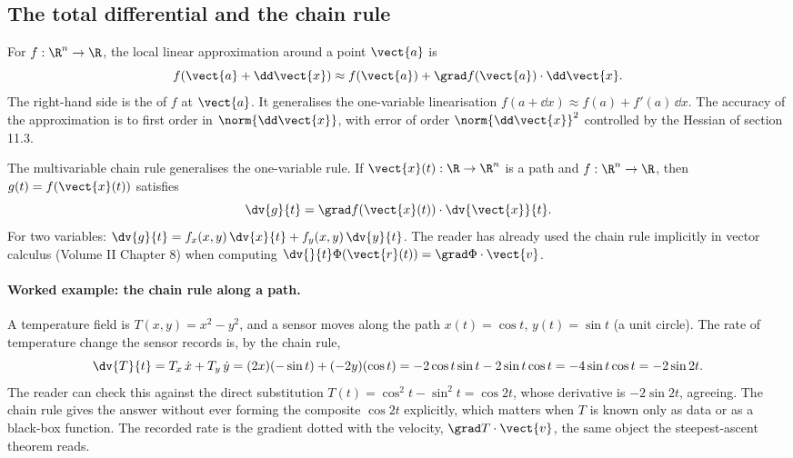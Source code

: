 

\subsection{The total differential and the chain rule}

For $f : \R^{n} \to \R$, the local linear approximation around a
point $\vect{a}$ is
\[
f(\vect{a} + \dd\vect{x}) \approx f(\vect{a}) + \grad f(\vect{a})
\cdot \dd\vect{x}.
\]
The right-hand side is the  of $f$ at
$\vect{a}$. It generalises the one-variable linearisation $f(a +
\dd x) \approx f(a) + f'(a)\,\dd x$. The accuracy of the
approximation is to first order in $\norm{\dd\vect{x}}$, with error
of order $\norm{\dd\vect{x}}^{2}$ controlled by the Hessian of
section 11.3.

The multivariable chain rule generalises the one-variable rule. If
$\vect{x}(t) : \R \to \R^{n}$ is a path and $f : \R^{n} \to \R$, then
$g(t) = f(\vect{x}(t))$ satisfies
\[
\dv{g}{t} = \grad f(\vect{x}(t)) \cdot \dv{\vect{x}}{t}.
\]
For two variables: $\dv{g}{t} = f_{x}(x, y)\,\dv{x}{t} +
f_{y}(x, y)\,\dv{y}{t}$. The reader has already used the chain rule
implicitly in vector calculus (Volume II Chapter 8) when computing
$\dv{}{t}\Phi(\vect{r}(t)) = \grad\Phi \cdot \vect{v}$.

\paragraph{Worked example: the chain rule along a path.} A
temperature field is $T(x, y) = x^{2} - y^{2}$, and a sensor moves
along the path $x(t) = \cos t$, $y(t) = \sin t$ (a unit circle). The
rate of temperature change the sensor records is, by the chain rule,
\[
\dv{T}{t} = T_{x}\,\dot{x} + T_{y}\,\dot{y}
= (2x)(-\sin t) + (-2y)(\cos t)
= -2\cos t\sin t - 2\sin t\cos t = -4\sin t\cos t = -2\sin 2t.
\]
The reader can check this against the direct substitution $T(t) =
\cos^{2}t - \sin^{2}t = \cos 2t$, whose derivative is $-2\sin 2t$,
agreeing. The chain rule gives the answer without ever forming the
composite $\cos 2t$ explicitly, which matters when $T$ is known only
as data or as a black-box function. The recorded rate is the
gradient dotted with the velocity, $\grad T \cdot \vect{v}$, the
same object the steepest-ascent theorem reads.

